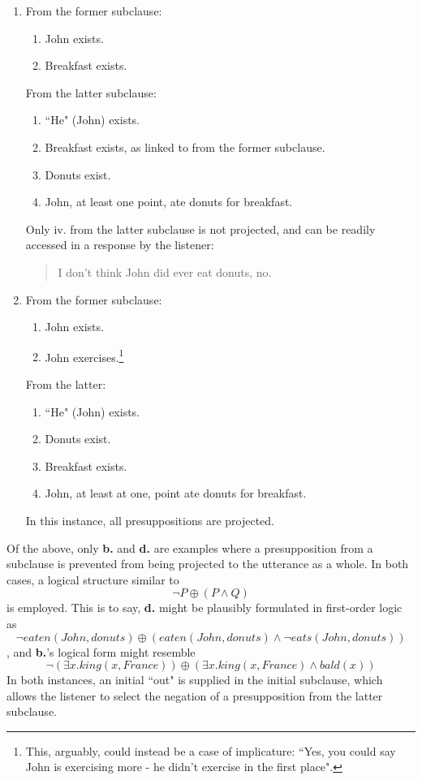 \documentclass[12pt,a4paper]{article}
\begin{document}
\begin{enumerate}
\begin{enumerate}
\item
From the former subclause:
\begin{enumerate}
\item John exists.
\item Breakfast exists.
\end{enumerate}
From the latter subclause:
\begin{enumerate}
\item ``He" (John) exists.
\item Breakfast exists, as linked to from the former subclause.
\item Donuts exist.
\item John, at least one point, ate donuts for breakfast.
\end{enumerate}
Only iv. from the latter subclause is not projected, and can be readily accessed in a response by the listener:
\begin{quote}
I don't think John did ever eat donuts, no.
\end{quote} 

\item
From the former subclause:
\begin{enumerate}
\item John exists.
\item John exercises.\footnote{This, arguably, could instead be a case of implicature: ``Yes, you could say John is exercising more - he didn't exercise in the first place".}
\end{enumerate}
From the latter:
\begin{enumerate}
\item ``He" (John) exists.
\item Donuts exist.
\item Breakfast exists.
\item John, at least at one, point ate donuts for breakfast.
\end{enumerate}
In this instance, all presuppositions are projected.

\end{enumerate}
Of the above, only \textbf{b.} and \textbf{d.} are examples where a presupposition from a subclause is prevented from being projected to the utterance as a whole. In both cases, a logical structure similar to 
\[
\neg P \oplus (P \wedge Q)
\]
is employed. This is to say, \textbf{d.} might be plausibly formulated in first-order logic as
\[
\neg eaten(John, donuts) \oplus (eaten(John, donuts) \wedge \neg eats(John, donuts))
\],
and \textbf{b.}'s logical form might resemble
\[
\neg (\exists x. king(x, France)) \oplus (\exists x. king(x, France) \wedge bald(x))
\]
In both instances, an initial ``out" is supplied in the initial subclause, which allows the listener to select the negation of a presupposition from the latter subclause.

\end{enumerate}
\end{document}
